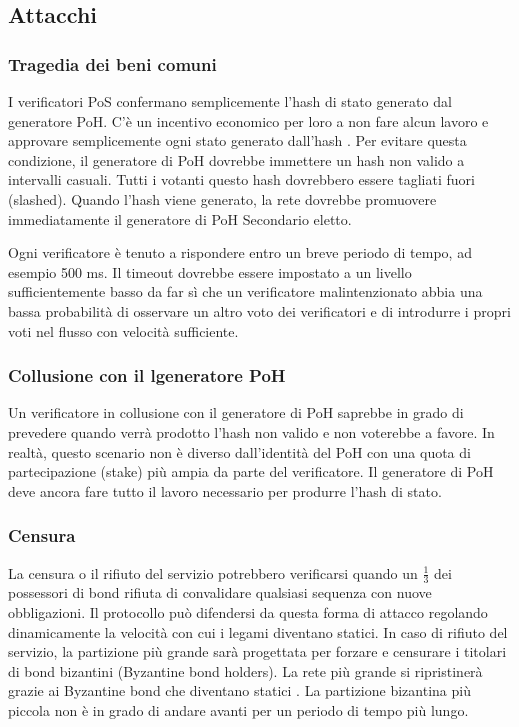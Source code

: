 \documentclass[12pt]{article}
\begin{document}
\subsection{Attacchi}
\subsubsection{Tragedia dei beni comuni}
I verificatori PoS confermano semplicemente l'hash di stato generato dal generatore PoH. C'è un incentivo economico per loro a non fare alcun lavoro e approvare semplicemente  ogni stato generato dall'hash . Per evitare questa condizione, il generatore di PoH dovrebbe immettere un hash non valido a intervalli casuali. Tutti i votanti questo hash dovrebbero essere tagliati fuori (slashed). Quando l'hash viene generato, la rete dovrebbe promuovere immediatamente il generatore di PoH Secondario eletto.

Ogni verificatore è tenuto a rispondere entro un breve periodo di tempo, ad esempio 500 ms. Il timeout dovrebbe essere impostato a un livello sufficientemente basso da far sì che un verificatore malintenzionato abbia una bassa probabilità di osservare un altro voto dei verificatori e di introdurre i propri voti nel flusso con velocità sufficiente.


\subsubsection{Collusione con il lgeneratore PoH}\label{subsubsec:collusion}
Un verificatore in collusione con il generatore di PoH saprebbe in grado di prevedere quando verrà prodotto l'hash non valido e non voterebbe a favore. In realtà, questo scenario non è diverso dall'identità del PoH con una quota di partecipazione (stake) più ampia da parte del verificatore. Il generatore di PoH deve ancora fare tutto il lavoro necessario per produrre l'hash di stato.

\subsubsection{Censura}\label{censorship}
La censura o il rifiuto del servizio potrebbero verificarsi quando un \(\frac{1}{3}\) dei possessori di bond rifiuta di convalidare qualsiasi sequenza con nuove obbligazioni. Il protocollo può difendersi da questa forma di attacco regolando dinamicamente la velocità con cui i legami diventano statici. In caso di rifiuto del servizio, la partizione più grande sarà progettata per forzare e censurare i titolari di bond bizantini (Byzantine bond holders). La rete più grande si ripristinerà grazie ai Byzantine bond che diventano statici . La partizione bizantina più piccola non è in grado di andare avanti per un periodo di tempo più lungo.
\end{document}
